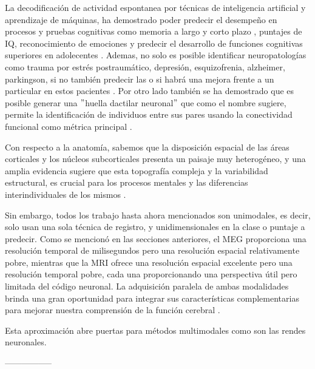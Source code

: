 \documentclass[11pt,letterpaper]{article}
\numberwithin{equation}{subsection}
\numberwithin{table}{subsection}
\begin{document}
\bigskip
\noindent La decodificación de actividad espontanea por técnicas de inteligencia artificial y aprendizaje de máquinas, ha demostrado poder predecir el desempeño en procesos \cite{liu2022decoding} y pruebas cognitivas como memoria a largo y corto plazo \cite{meskaldji2016prediction,plaschke2020age}, puntajes de IQ, reconocimiento de emociones y predecir el desarrollo de funciones cognitivas superiores en adolecentes \cite{sripada2020prediction}. Ademas, no solo es posible identificar neuropatologías como trauma por estrés postraumático, depresión, esquizofrenia, alzheimer, parkingson, si no también predecir las o si habrá una mejora frente a un particular en  estos pacientes \cite{long2020prediction}. Por otro lado también se ha demostrado que es posible generar una $"$huella dactilar neuronal$"$ que como el nombre sugiere, permite la identificación de individuos entre sus pares usando la conectividad funcional como métrica principal \cite{st2023functional}. 

\bigskip
\noindent Con respecto a la anatomía, sabemos que la disposición espacial de las áreas corticales y los núcleos subcorticales presenta un paisaje muy heterogéneo, y una amplia evidencia sugiere que esta topografía compleja y la variabilidad estructural, es crucial para los procesos mentales\cite{fox2012distributed} y las diferencias interindividuales de los mismos \cite{bijsterbosch2018relationship, cachia2018interindividual, kong2019spatial}.

\bigskip
\noindent Sin embargo, todos los trabajo hasta ahora mencionados son unimodales, es decir, solo usan una sola técnica de registro, y unidimensionales en la clase o puntaje a predecir. Como se mencionó en las secciones anteriores, el MEG proporciona una resolución temporal de milisegundos pero una resolución espacial relativamente pobre, mientras que la MRI ofrece una resolución espacial excelente pero una resolución temporal pobre, cada una proporcionando una perspectiva útil pero limitada del código neuronal. La adquisición paralela de ambas modalidades brinda una gran oportunidad para integrar sus características complementarias para mejorar nuestra comprensión de la función cerebral \cite{mulert2023eeg}.

\bigskip
\noindent Esta aproximación abre puertas para métodos multimodales como son las rendes neuronales.



   



-----------------
\bigskip
\end{document}
